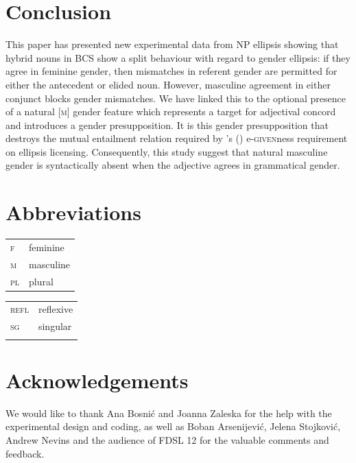 \documentclass[output=paper,
modfonts,
newtxmath,
hidelinks
]{langscibook}
\begin{document}
			
			\section{Conclusion}	
			
			This paper has presented new experimental data from  NP ellipsis showing that hybrid nouns in BCS show a split behaviour with regard to gender ellipsis: if they agree in feminine gender, then mismatches in referent gender are permitted for either the antecedent or elided noun. However, masculine agreement in either conjunct blocks gender mismatches. We have linked this to the optional presence of a natural [\textsc{m}] gender feature which represents a target for adjectival concord and introduces a gender presupposition.
			It is this gender presupposition that destroys the mutual entailment relation required by \citeauthor{merchant2001}'s (\citeyear{merchant2001}) e-\textsc{given}ness requirement on ellipsis licensing.
			Consequently,  this study suggest that natural masculine gender is syntactically absent when the adjective agrees in grammatical gender.
		
		
    
    
\section*{Abbreviations}

\begin{tabularx}{.5\textwidth}{@{}lQ@{}}
\textsc{f}&feminine\\
\textsc{m}&masculine\\
\textsc{pl}&plural\\
\end{tabularx}%
\begin{tabularx}{.5\textwidth}{@{}lQ@{}}
\textsc{refl}&reflexive\\
\textsc{sg}&singular\\
&\\
\end{tabularx}



\section*{Acknowledgements}

We would like to thank Ana Bosni\'{c} and Joanna Zaleska for the help with the experimental design and coding, as well as Boban Arsenijevi\'{c}, Jelena Stojkovi\'{c}, Andrew Nevins and the audience of FDSL 12 for the valuable comments and feedback.   
\end{document}
